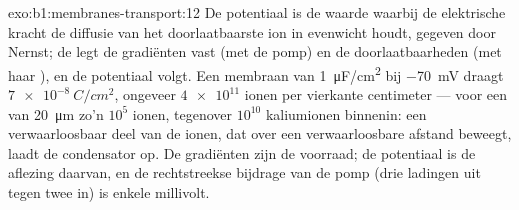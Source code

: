 \begin{solution}{exo:b1:membranes-transport:12}
De potentiaal is de waarde waarbij de elektrische kracht de diffusie van het
doorlaatbaarste ion in evenwicht houdt, gegeven door Nernst; de  legt de
gradiënten vast (met de pomp) en de doorlaatbaarheden (met haar ), en de
potentiaal volgt. Een membraan van \qty{1}{\micro F/cm^2} bij \qty{-70}{mV}
draagt $\qty{7e-8}{C/cm^2}$, ongeveer $\num{4e11}$ ionen per vierkante centimeter
--- voor een  van \qty{20}{\micro m} zo'n $10^5$ ionen, tegenover $10^{10}$
kaliumionen binnenin: een verwaarloosbaar deel van de ionen, dat over een
verwaarloosbare afstand beweegt, laadt de condensator op. De gradiënten zijn de
voorraad; de potentiaal is de aflezing daarvan, en de rechtstreekse bijdrage van
de pomp (drie ladingen uit tegen twee in) is enkele millivolt.
\end{solution}

